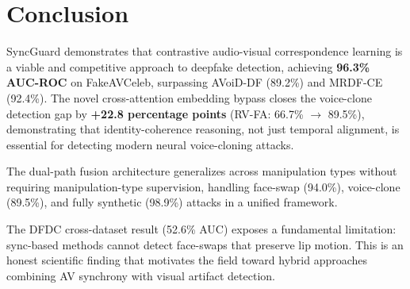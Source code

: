 \documentclass[12pt, letterpaper]{article}
\begin{document}
\section{Conclusion}

SyncGuard demonstrates that contrastive audio-visual correspondence learning is a viable and competitive approach to deepfake detection, achieving \textbf{96.3\% AUC-ROC} on FakeAVCeleb, surpassing AVoiD-DF (89.2\%) and MRDF-CE (92.4\%). The novel cross-attention embedding bypass closes the voice-clone detection gap by \textbf{+22.8 percentage points} (RV-FA: 66.7\% $\to$ 89.5\%), demonstrating that identity-coherence reasoning, not just temporal alignment, is essential for detecting modern neural voice-cloning attacks.

The dual-path fusion architecture generalizes across manipulation types without requiring manipulation-type supervision, handling face-swap (94.0\%), voice-clone (89.5\%), and fully synthetic (98.9\%) attacks in a unified framework.

The DFDC cross-dataset result (52.6\% AUC) exposes a fundamental limitation: sync-based methods cannot detect face-swaps that preserve lip motion. This is an honest scientific finding that motivates the field toward hybrid approaches combining AV synchrony with visual artifact detection.
\end{document}
